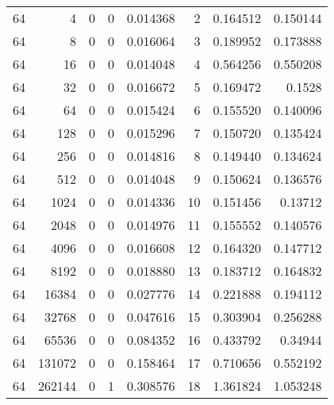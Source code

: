 \begin{longtable}[c]{@{}rrrrrrrr@{}}
    64        & 4         & 0         & 0        & 0.014368    & 2                   & 0.164512    & 0.150144   \\
    64        & 8         & 0         & 0        & 0.016064    & 3                   & 0.189952    & 0.173888   \\
    64        & 16        & 0         & 0        & 0.014048    & 4                   & 0.564256    & 0.550208   \\
    64        & 32        & 0         & 0        & 0.016672    & 5                   & 0.169472    & 0.1528     \\
    64        & 64        & 0         & 0        & 0.015424    & 6                   & 0.155520    & 0.140096   \\
    64        & 128       & 0         & 0        & 0.015296    & 7                   & 0.150720    & 0.135424   \\
    64        & 256       & 0         & 0        & 0.014816    & 8                   & 0.149440    & 0.134624   \\
    64        & 512       & 0         & 0        & 0.014048    & 9                   & 0.150624    & 0.136576   \\
    64        & 1024      & 0         & 0        & 0.014336    & 10                  & 0.151456    & 0.13712    \\
    64        & 2048      & 0         & 0        & 0.014976    & 11                  & 0.155552    & 0.140576   \\
    64        & 4096      & 0         & 0        & 0.016608    & 12                  & 0.164320    & 0.147712   \\
    64        & 8192      & 0         & 0        & 0.018880    & 13                  & 0.183712    & 0.164832   \\
    64        & 16384     & 0         & 0        & 0.027776    & 14                  & 0.221888    & 0.194112   \\
    64        & 32768     & 0         & 0        & 0.047616    & 15                  & 0.303904    & 0.256288   \\
    64        & 65536     & 0         & 0        & 0.084352    & 16                  & 0.433792    & 0.34944    \\
    64        & 131072    & 0         & 0        & 0.158464    & 17                  & 0.710656    & 0.552192   \\
    64        & 262144    & 0         & 1        & 0.308576    & 18                  & 1.361824    & 1.053248   \\

\end{longtable}
